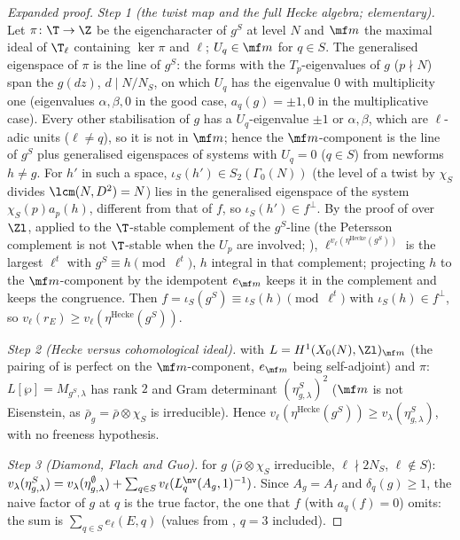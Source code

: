 \begin{sloppypar}
\begin{proof}[Expanded proof]
\emph{Step 1 (the twist map and the full Hecke algebra; elementary).} Let $\pi\colon\T\to\Z$ be the eigencharacter of $g^S$ at level $N$ and $\mf m$ the maximal ideal of $\T_\ell$ containing $\ker\pi$ and $\ell$;
$U_q\in\mf m$ for $q\in S$. The generalised eigenspace of $\pi$ is the line of $g^S$: the forms with the $T_p$-eigenvalues of $g$ ($p\nmid N$) span the $g(dz)$, $d\mid N/N_S$, on which $U_q$ has the
eigenvalue $0$ with multiplicity one (eigenvalues $\alpha,\beta,0$ in the good case, $a_q(g)=\pm1,0$ in the multiplicative case). Every other stabilisation of $g$ has a $U_q$-eigenvalue $\pm1$ or
$\alpha,\beta$, which are $\ell$-adic units ($\ell\ne q$), so it is not in $\mf m$; hence the $\mf m$-component is the line of $g^S$ plus generalised eigenspaces of systems with $U_q=0$ ($q\in S$) from
newforms $h\ne g$. For $h'$ in such a space, $\iota_S(h')\in S_2(\Gamma_0(N))$ (the level of a twist by $\chi_S$ divides $\lcm(N,D^2)=N$) lies in the generalised eigenspace of the system
$\chi_S(p)a_p(h)$, different from that of $f$, so $\iota_S(h')\in f^\perp$. By the proof of  over $\Zl$, applied to the $\T$-stable complement of the $g^S$-line (the Petersson
complement is not $\T$-stable when the $U_p$ are involved; ), $\ell^{v_\ell(\eta^{\mathrm{Hecke}}(g^S))}$ is the largest $\ell^t$ with $g^S\equiv h\pmod{\ell^t}$, $h$ integral in that complement;
projecting $h$ to the $\mf m$-component by the idempotent $e_{\mf m}$ keeps it in the complement and keeps the congruence. Then $f=\iota_S(g^S)\equiv\iota_S(h)\pmod{\ell^t}$ with $\iota_S(h)\in f^\perp$,
so $v_\ell(r_E)\ge v_\ell(\eta^{\mathrm{Hecke}}(g^S))$.

\emph{Step 2 (Hecke versus cohomological ideal).}  with $L=H^1(X_0(N),\Zl)_{\mf m}$ (the pairing of  is perfect on the $\mf m$-component, $e_{\mf m}$ being
self-adjoint) and $\pi$: $L[\wp]=M_{g^S,\lambda}$ has rank $2$ and Gram determinant $(\eta^S_{g,\lambda})^2$ ($\mf m$ is not Eisenstein, as $\bar\rho_g=\bar\rho\otimes\chi_S$ is irreducible). Hence
$v_\ell(\eta^{\mathrm{Hecke}}(g^S))\ge v_\lambda(\eta^S_{g,\lambda})$, with no freeness hypothesis.

\emph{Step 3 (Diamond, Flach and Guo).}  for $g$ ($\bar\rho\otimes\chi_S$ irreducible, $\ell\nmid2N_S$, $\ell\notin S$): $v_\lambda(\eta^S_{g,\lambda})=v_\lambda(\eta^\emptyset_{g,\lambda})+\sum_{q\in S}v_\ell(L^{\nv}_q(A_g,1)^{-1})$.
Since $A_g=A_f$ and $\delta_q(g)\ge1$, the naive factor of $g$ at $q$ is the true factor, the one that $f$ (with $a_q(f)=0$) omits: the sum is $\sum_{q\in S}e_\ell(E,q)$ (values from
, $q=3$ included).


\end{proof}
\end{sloppypar}
